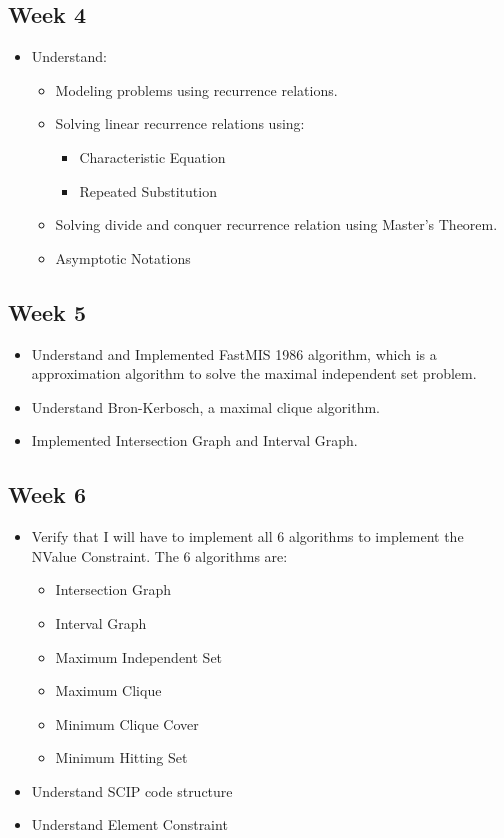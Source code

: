 \documentclass[a4paper,12pt]{article}
\begin{document}
\subsection{Week 4}
	\begin{itemize}
		\item Understand: 
		\begin{itemize}
			\item Modeling problems using recurrence relations. 
			\item Solving linear recurrence relations using: 
			\begin{itemize}
				\item Characteristic Equation
				\item Repeated Substitution
			\end{itemize}
			\item Solving divide and conquer recurrence relation using 	Master's Theorem. 
			\item Asymptotic Notations 
		\end{itemize} 
	\end{itemize} 
	
\subsection{Week 5}
	\begin{itemize}
		\item Understand and Implemented FastMIS 1986 algorithm, which is a approximation algorithm to solve the maximal independent set problem. 
		\item Understand Bron-Kerbosch, a maximal clique algorithm. 
		\item Implemented Intersection Graph and Interval Graph. 
	\end{itemize} 

	
\subsection{Week 6}
	\begin{itemize}
		\item Verify that I will have to implement all 6 algorithms to implement the NValue Constraint. The 6 algorithms are: 
		\begin{itemize}
			\item Intersection Graph 
			\item Interval Graph
			\item Maximum Independent Set
			\item Maximum Clique 
			\item Minimum Clique Cover
			\item Minimum Hitting Set 
		\end{itemize}
		\item Understand SCIP code structure
		\item Understand Element Constraint 

	\end{itemize}
	
\end{document}
